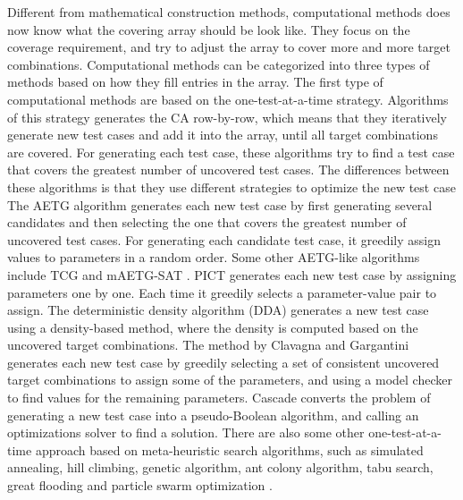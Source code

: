 \documentclass[10pt,conference, compsocconf]{IEEEtran}
\begin{document}
\begin{CJK}{UTF8}{gkai}
Different from mathematical construction methods, computational
methods does now know what the covering array should be look like. They focus on
the coverage requirement, and try to adjust the array to cover more and more
target combinations.
Computational methods can be
categorized into three types of methods\cite{nie11CSUR} based on how they fill entries in the
array.
The first type of computational methods are based on the one-test-at-a-time
strategy\cite{kuhn13book}. Algorithms of this strategy generates the CA row-by-row, which means
that they iteratively generate new test cases and add it into the array, until
all target combinations are covered. For generating each test case, these
algorithms try to find a test case that covers the greatest number of uncovered
test cases. The differences between these algorithms is that they use different
strategies to optimize the new test case\cite{sherwood94STAR}
The AETG algorithm
generates each new test case by first generating several candidates and then
selecting the one that covers the greatest number of uncovered test cases.  For
generating each candidate test case, it greedily assign values to parameters in
a random order. Some other AETG-like algorithms include TCG \cite{tung00AC} and
mAETG-SAT \cite{cohen07ISSTA,cohen08TSE}. PICT \cite{czerwonka06PNSQC} generates
each new test case by assigning parameters one by one. Each time it greedily
selects a parameter-value pair to assign.  The deterministic density algorithm
(DDA) generates a new test case using a density-based method, where the density
is computed based on the uncovered target combinations. The method by Clavagna
and Gargantini \cite{calvagna08TAP} generates each new test case by greedily
selecting a set of consistent uncovered target combinations to assign some of
the parameters, and using a model checker to find values for the remaining
parameters. Cascade \cite{zhao13ICSTW,zhang14JSS} converts the problem of
generating a new test case into a pseudo-Boolean algorithm, and calling an
optimizations solver to find a solution. There are also some other
one-test-at-a-time approach based on meta-heuristic search algorithms, such as
simulated annealing, hill climbing, genetic algorithm, ant colony algorithm,
tabu search, great flooding and particle swarm optimization
\cite{shiba04COMPSAC,bryce07GECCO,ahmed11JSS,ahmed12ASC}.


\end{CJK}
\end{document}
